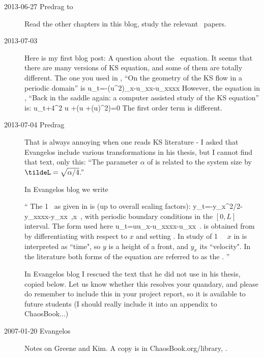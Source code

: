 \begin{description}

\item[2013-06-27 Predrag to \XD] Read the other chapters in this blog,
    study the relevant \KS\ papers.

\item[2013-07-03 \XD] Here is my first blog post: A question about the
    \KS\ equation. It seems that there are many versions of KS
    equation, and some of them are totally different. The one you used
    in , ``On the {\statesp} geometry of the KS flow in a
    periodic domain'' is \beq
 u_t=-(u^2)_x-u_{xx}-u_{xxxx}
However, the
equation in , ``Back in the saddle again: a computer
assisted study of the KS equation'' is:
\beq
 u_t+4\bigtriangleup^2 u
    +\alpha (\bigtriangleup u +(\bigtriangledown u)^2)=0
The first order term is different.

\item[2013-07-04 Predrag] That is always annoying when one reads
KS literature - I asked that Evangelos include various transformations
in his thesis, but I cannot find that text, only this:
``The parameter $\alpha$ of  is
related to the system size by $\tildeL=\sqrt{\alpha/4}$.''

In Evangelos
 {blog} we write

``
The {1\dmn} \KSe\ as given in  is (up to overall scaling
factors):
\beq
    y_t=-y_x^2/2-y_{xxxx}-y_{xx}
\,,\qquad       x \in [0,L]
\,,
    \label{eq:KSeOR}
\eeq
with periodic boundary conditions in the $[0,L]$ interval. The form used
here
\beq
    u_t=uu_x-u_{xxxx}-u_{xx}
\,.
    \label{eq:KSeAP}
\eeq
is obtained from  by differentiating with respect to $x$
and setting .
In study of {1\dmn} \KS\ \eqva\ $x$ in 
is interpreted as ``time", so $y$ is a height of a front,
and $y_x$ its ``velocity".
In the literature  both forms of the equation are
referred to as the \KSe.
''

In Evangelos blog I rescued the text that he did not use in his thesis,
copied below.
Let us know whether this resolves your quandary,
and please do remember to include this in your project
report, so it is available to future students (I should really
include it into an appendix to ChaosBook...)            \toCB

\item[2007-01-20 Evangelos]
Notes on Greene and Kim. A copy is in ChaosBook.org/library,
.


\end{description}
